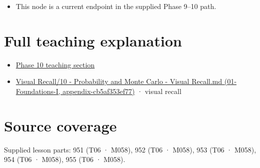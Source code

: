 \begin{itemize}
\tightlist
\item
  This node is a current endpoint in the supplied Phase 9--10 path.
\end{itemize}

\section{Full teaching explanation}\label{appendix-33237f0f618b-full-teaching-explanation}

\begin{itemize}
\tightlist
\item
  \href{Continuous\%20Notes/Computing\%20Foundations\%20-\%20From\%20Bits\%20to\%20C++\%20and\%20Systems\%20APIs\#9.\%20Finite\%20samples\%20need\%20stable\%20descriptive\%20statistics}{Phase 10 teaching section}
\item
  \href{../01-Foundations-I/main.pdf\#nameddest=appendix-cb5af353ef77}{Visual Recall/10 - Probability and Monte Carlo - Visual Recall.md (01-Foundations-I, appendix-cb5af353ef77)} · visual recall
\end{itemize}

\section{Source coverage}\label{appendix-33237f0f618b-source-coverage}

Supplied lesson parts: 951 (T06 · M058), 952 (T06 · M058), 953 (T06 · M058), 954 (T06 · M058), 955 (T06 · M058).
